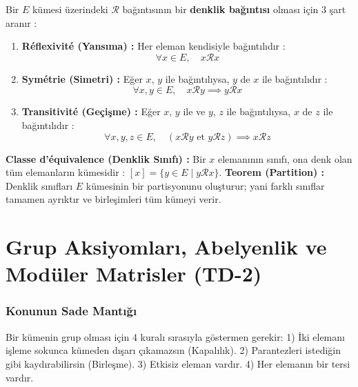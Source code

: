 \documentclass[11pt,a4paper]{article}
\begin{document}
\begin{tcolorbox}[colback=teal!5!white,colframe=teal!80!black,title=Denklik Bağıntısı Tanımı (Relation d'équivalence)]
Bir $E$ kümesi üzerindeki $\mathcal{R}$ bağıntısının bir \textbf{denklik bağıntısı} olması için 3 şart aranır :
\begin{enumerate}
    \item \textbf{Réflexivité (Yansıma) :} Her eleman kendisiyle bağıntılıdır :
    \[ \forall x \in E, \quad x \mathcal{R} x \]
    \item \textbf{Symétrie (Simetri) :} Eğer $x$, $y$ ile bağıntılıysa, $y$ de $x$ ile bağıntılıdır :
    \[ \forall x, y \in E, \quad x \mathcal{R} y \implies y \mathcal{R} x \]
    \item \textbf{Transitivité (Geçişme) :} Eğer $x$, $y$ ile ve $y$, $z$ ile bağıntılıysa, $x$ de $z$ ile bağıntılıdır :
    \[ \forall x, y, z \in E, \quad (x \mathcal{R} y \text{ et } y \mathcal{R} z) \implies x \mathcal{R} z \]
\end{enumerate}
\textbf{Classe d'équivalence (Denklik Sınıfı) :} Bir $x$ elemanının sınıfı, ona denk olan tüm elemanların kümesidir : $[x] = \{ y \in E \mid y \mathcal{R} x \}$.  
\textbf{Teorem (Partition) :} Denklik sınıfları $E$ kümesinin bir partisyonunu oluşturur; yani farklı sınıflar tamamen ayrıktır ve birleşimleri tüm kümeyi verir.
\end{tcolorbox}

\vspace{0.5cm}

\section{Grup Aksiyomları, Abelyenlik ve Modüler Matrisler (TD-2)}

\subsubsection*{Konunun Sade Mantığı}
Bir kümenin grup olması için 4 kuralı sırasıyla göstermen gerekir: 
1) İki elemanı işleme sokunca kümeden dışarı çıkamazsın (Kapalılık).  
2) Parantezleri istediğin gibi kaydırabilirsin (Birleşme).  
3) Etkisiz eleman vardır.  
4) Her elemanın bir tersi vardır.
\end{document}
